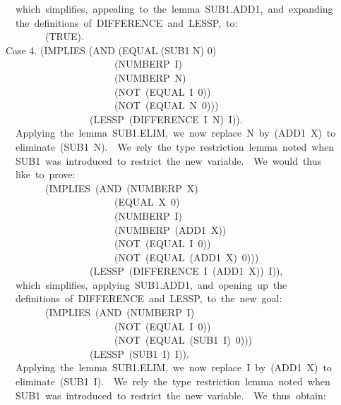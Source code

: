 \documentclass[10pt]{book}
\newenvironment{pubasis}{\begin{flushleft}}{\end{flushleft}}
\begin{document}
\begin{pubasis}
~~which~simplifies,~appealing~to~the~lemma~SUB1.ADD1,~and~expanding\\
~~the~definitions~of~DIFFERENCE~and~LESSP,~to:\\

~~~~~~~~(TRUE).\\

Case 4.	(IMPLIES (AND (EQUAL (SUB1 N) 0)\\
~~~~~~~~~~~~~~~~~~~~~~(NUMBERP~I)\\
~~~~~~~~~~~~~~~~~~~~~~(NUMBERP~N)\\
~~~~~~~~~~~~~~~~~~~~~~(NOT~(EQUAL~I~0))\\
~~~~~~~~~~~~~~~~~~~~~~(NOT~(EQUAL~N~0)))\\
~~~~~~~~~~~~~~~~~(LESSP~(DIFFERENCE~I~N)~I)).\\

~~Applying~the~lemma~SUB1.ELIM,~we~now~replace~N~by~(ADD1~X)~to\\
~~eliminate~(SUB1~N).~~We~rely~the~type~restriction~lemma~noted~when\\
~~SUB1~was~introduced~to~restrict~the~new~variable.~~We~would~thus\\
~~like~to~prove:\\

~~~~~~~~(IMPLIES~(AND~(NUMBERP~X)\\
~~~~~~~~~~~~~~~~~~~~~~(EQUAL~X~0)\\
~~~~~~~~~~~~~~~~~~~~~~(NUMBERP~I)\\
~~~~~~~~~~~~~~~~~~~~~~(NUMBERP~(ADD1~X))\\
~~~~~~~~~~~~~~~~~~~~~~(NOT~(EQUAL~I~0))\\
~~~~~~~~~~~~~~~~~~~~~~(NOT~(EQUAL~(ADD1~X)~0)))\\
~~~~~~~~~~~~~~~~~(LESSP~(DIFFERENCE~I~(ADD1~X))~I)),\\

~~which~simplifies,~applying~SUB1.ADD1,~and~opening~up~the\\
~~definitions~of~DIFFERENCE~and~LESSP,~to~the~new~goal:\\

~~~~~~~~(IMPLIES~(AND~(NUMBERP~I)\\
~~~~~~~~~~~~~~~~~~~~~~(NOT~(EQUAL~I~0))\\
~~~~~~~~~~~~~~~~~~~~~~(NOT~(EQUAL~(SUB1~I)~0)))\\
~~~~~~~~~~~~~~~~~(LESSP~(SUB1~I)~I)).\\

~~Applying~the~lemma~SUB1.ELIM,~we~now~replace~I~by~(ADD1~X)~to\\
~~eliminate~(SUB1~I).~~We~rely~the~type~restriction~lemma~noted~when\\
~~SUB1~was~introduced~to~restrict~the~new~variable.~~We~thus~obtain:\\


\end{pubasis}
\end{document}
